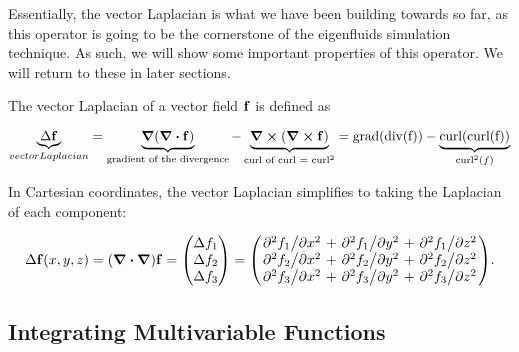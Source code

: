 Essentially, the vector Laplacian is what we have been building towards so far,
as this operator is going to be the cornerstone of the eigenfluids simulation
technique. As such, we will show some important properties
of this operator. We will return to these in later sections.

The vector Laplacian of a vector field $\vb{f}$ is defined as

$$\underbrace{\Delta \vb{f}}_{vector Laplacian} = 
\underbrace{\grad(\div{\vb{f}})}_{\text{gradient of the divergence}} - 
\underbrace{\curl(\curl{\vb{f}})}_{\text{curl of curl = curl}^2} =
    \text{grad(div(f))} - \underbrace{\text{curl(curl(f))}}_{\text{curl}^2(f)}$$

In Cartesian coordinates, the vector Laplacian simplifies to taking the
Laplacian of each component:

\begin{equation}
    \Delta\vb{f}(x, y, z) = (\grad\vdot\grad)\vb{f} = 
    \mqty(\Delta f_1 \\ \Delta f_2 \\ \Delta f_3) =
    \mqty(
        \pdv*[2]{f_1}{x} + \pdv*[2]{f_1}{y} + \pdv*[2]{f_1}{z}\\
        \pdv*[2]{f_2}{x} + \pdv*[2]{f_2}{y} + \pdv*[2]{f_2}{z}\\
        \pdv*[2]{f_3}{x} + \pdv*[2]{f_3}{y} + \pdv*[2]{f_3}{z}
    ).
\end{equation}


\subsection*{Integrating Multivariable Functions}


